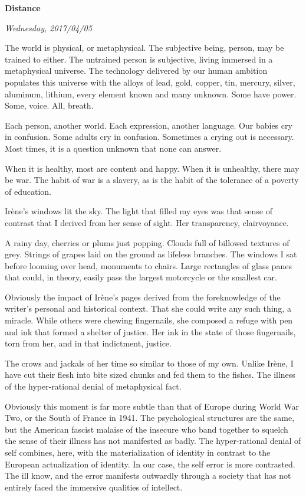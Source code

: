 

\centerline{\bf Distance}
\centerline{\it Wednesday, 2017/04/05}



\vfill
\break

The world is physical, or metaphysical.  The subjective being, person,
may be trained to either.  The untrained person is subjective, living
immersed in a metaphysical universe.  The technology delivered by our
human ambition populates this universe with the alloys of lead, gold,
copper, tin, mercury, silver, aluminum, lithium, every element known
and many unknown. \break Some have power.  Some, voice.  All, breath.

Each person, another world.  Each expression, another language.  Our
babies cry in confusion.  Some adults cry in confusion.  Sometimes a
crying out is necessary.  Most times, it is a question unknown that
none can answer.

When it is healthy, most are content and happy.  When it is unhealthy,
there may be war.  The habit of war is a slavery, as is the habit of
the tolerance of a poverty of education.

\vfill
\break

﻿Ir\`{e}ne's windows lit the sky.  The light that filled my eyes was
that sense of contrast that I derived from her sense of sight.  Her
transparency, clairvoyance.

A rainy day, cherries or plums just popping.  Clouds full of billowed
textures of grey.  Strings of grapes laid on the ground as lifeless
branches.  The windows I sat before looming over head, monuments to
chairs.  Large rectangles of glass panes that could, in theory, easily
pass the largest motorcycle or the smallest car.

Obviously the impact of Ir\`{e}ne's pages derived from the
foreknowledge of the writer's personal and historical context.  That
she could write any such thing, a miracle.  While others were chewing
fingernails, she composed a refuge with pen and ink that formed a
shelter of justice.  Her ink in the state of those fingernails, torn
from her, and in that indictment, justice.

The crows and jackals of her time so similar to those of my own.
Unlike Ir\`{e}ne, I have cut their flesh into bite sized chunks and
fed them to the fishes.  The illness of the hyper-rational denial of
metaphysical fact.

Obviously this moment is far more subtle than that of Europe during
World War Two, or the South of \break France in 1941.  The psychological
structures are the same, but the American fascist malaise of the
insecure who band together to squelch the sense of their illness has
not manifested as badly.  The hyper-rational denial of self combines,
here, with the materialization of identity in contrast to the European
actualization of identity.  In our case, the self error is more
contrasted.  The ill know, and the error manifests outwardly through a
society that has not entirely faced the immersive qualities of
intellect.

